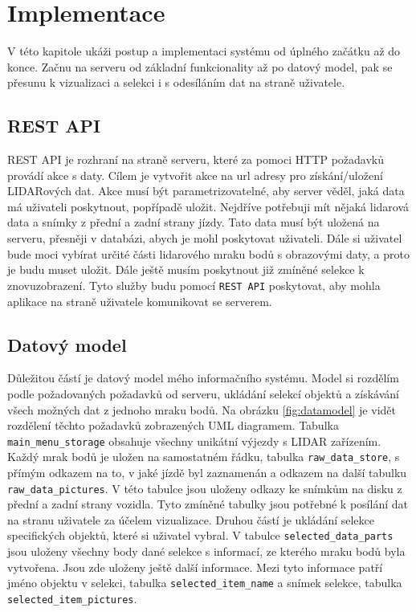 \documentclass[czech,bachelor,dept420,male,cpdeclaration]{diploma}
\begin{document}
\section{Implementace}
V této kapitole ukáži postup a implementaci systému od úplného začátku až do konce. Začnu na serveru od základní funkcionality až po datový model, pak se přesunu k vizualizaci a selekci i s odesíláním dat na straně uživatele.


\subsection{REST API} 
REST API je rozhraní na straně serveru, které za pomoci HTTP požadavků provádí akce s daty. Cílem je vytvořit akce na url adresy pro získání/uložení LIDARových dat. Akce musí být parametrizovatelné, aby server věděl, jaká data má uživateli poskytnout, popřípadě uložit. Nejdříve potřebuji mít nějaká lidarová data a snímky z přední a zadní strany jízdy. Tato data musí být uložená na serveru, přesněji v databázi, abych je mohl poskytovat uživateli. Dále si uživatel bude moci vybírat určité části lidarového mraku bodů s obrazovými daty, a proto je budu muset uložit. Dále ještě musím poskytnout již zmíněné selekce k znovuzobrazení. Tyto služby budu pomocí \texttt{REST API} poskytovat, aby mohla aplikace na straně uživatele komunikovat se serverem.


\subsection{Datový model} 
Důležitou částí je datový model mého informačního systému. Model si rozdělím podle požadovaných požadavků od serveru, ukládání selekcí objektů a získávání všech možných dat z jednoho mraku bodů. Na obrázku \ref{fig:datamodel} je vidět rozdělení těchto požadavků zobrazených UML diagramem. Tabulka \texttt{main\_menu\_storage} obsahuje všechny unikátní výjezdy s LIDAR zařízením. Každý mrak bodů je uložen na samostatném řádku, tabulka \texttt{raw\_data\_store}, s přímým odkazem na to, v jaké jízdě byl zaznamenán a odkazem na další tabulku \texttt{raw\_data\_pictures}. V této tabulce jsou uloženy odkazy ke snímkům na disku z přední a zadní strany vozidla. Tyto zmíněné tabulky jsou potřebné k posílání dat na stranu uživatele za účelem vizualizace. Druhou částí je ukládání selekce specifických objektů, které si uživatel vybral. V tabulce \texttt{selected\_data\_parts} jsou uloženy všechny body dané selekce s informací, ze kterého mraku bodů byla vytvořena. Jsou zde uloženy ještě další informace. Mezi tyto informace patří jméno objektu v selekci, tabulka \texttt{selected\_item\_name} a snímek selekce, tabulka \texttt{selected\_item\_pictures}.
\end{document}
